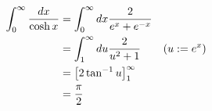\item

\begin{align*}
	\int_0^\infty \frac{dx}{\cosh x}
	 & = \int_0^\infty dx \frac{2}{e^x + e^{-x}}              \\
	 & = \int_1^\infty du \frac{2}{u^2 + 1}      & (u := e^x) \\
	 & = {\left[ 2\tan^{-1} u \right]_{1}^{\infty}}                \\
	 & = \frac{\pi}{2}
\end{align*}